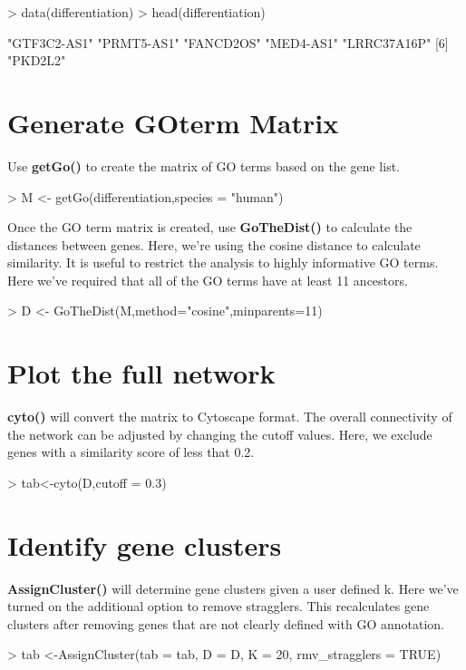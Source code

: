 \documentclass{article}
\begin{document}
\begin{Schunk}
\begin{Sinput}
> data(differentiation)
> head(differentiation)
\end{Sinput}
\begin{Soutput}
[1] "GTF3C2-AS1" "PRMT5-AS1"  "FANCD2OS"   "MED4-AS1"   "LRRC37A16P"
[6] "PKD2L2"    
\end{Soutput}
\end{Schunk}

\section*{Generate GOterm Matrix}
Use \textbf{getGo()} to create the matrix of GO terms based on the gene list.
\begin{Schunk}
\begin{Sinput}
> M <- getGo(differentiation,species = "human")
\end{Sinput}
\end{Schunk}


Once the GO term matrix is created, use \textbf{GoTheDist()} to calculate the distances between genes. Here, we're using the cosine distance to calculate similarity. It is useful to restrict the analysis to highly informative GO terms. Here we've required that all of the GO terms have at least 11 ancestors. 
\vspace{5mm}

\begin{Schunk}
\begin{Sinput}
> D <- GoTheDist(M,method="cosine",minparents=11)
\end{Sinput}
\end{Schunk}

\section*{Plot the full network}
\textbf{cyto()} will convert the matrix to Cytoscape format. The overall connectivity of the network can be adjusted by changing the cutoff values. Here, we exclude genes with a similarity score of less that 0.2.
\vspace{5mm}
\begin{Schunk}
\begin{Sinput}
> tab<-cyto(D,cutoff = 0.3)
\end{Sinput}
\end{Schunk}

\section*{Identify gene clusters}
\textbf{AssignCluster()} will determine gene clusters given a user defined k. Here we've turned on the additional option to remove stragglers. This recalculates gene clusters after removing genes that are not clearly defined with GO annotation.
\vspace{5mm}
\begin{Schunk}
\begin{Sinput}
> tab <-AssignCluster(tab = tab, D = D, K = 20, rmv_stragglers = TRUE)
\end{Sinput}
\end{Schunk}
\end{document}
